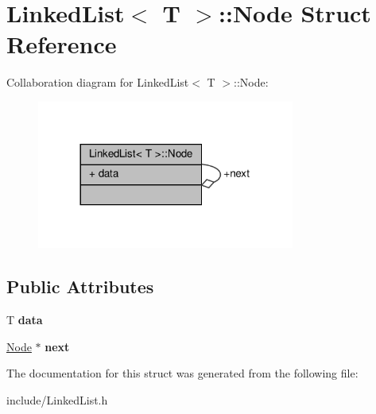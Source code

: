 \hypertarget{structLinkedList_1_1Node}{}\section{Linked\+List$<$ T $>$\+:\+:Node Struct Reference}
\label{structLinkedList_1_1Node}


Collaboration diagram for Linked\+List$<$ T $>$\+:\+:Node\+:\nopagebreak
\begin{figure}[H]
\begin{center}
\leavevmode
\includegraphics[width=240pt]{structLinkedList_1_1Node__coll__graph}
\end{center}
\end{figure}
\subsection*{Public Attributes}
\begin{DoxyCompactItemize}
\item 
\mbox{\label{structLinkedList_1_1Node_ad2de6fe830fed52d6782ff2caacc51ac}} 
T {\bfseries data}
\item 
\mbox{\label{structLinkedList_1_1Node_aaf5f5d6645d0854e3ed2493bbea57f78}} 
\hyperlink{structLinkedList_1_1Node}{Node} $\ast$ {\bfseries next}
\end{DoxyCompactItemize}


The documentation for this struct was generated from the following file\+:\begin{DoxyCompactItemize}
\item 
include/Linked\+List.\+h\end{DoxyCompactItemize}
